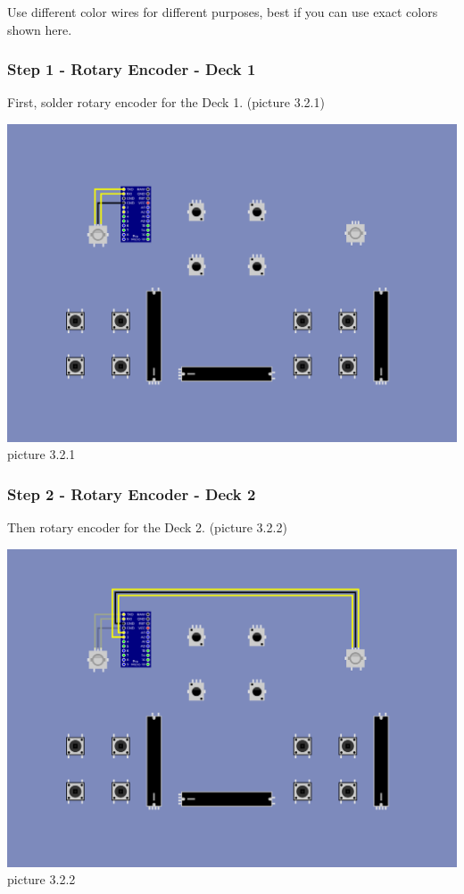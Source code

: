 \documentclass[12pt, a4paper]{article}
\begin{document}
			\noindent Use different color wires for different purposes, best if you can use exact colors shown here. \\
			
			\newpage
			
			
			\subsubsection{Step 1 - Rotary Encoder - Deck 1}
			
				\noindent First, solder rotary encoder for the Deck 1. (picture 3.2.1)
				
				\begin{center}
					\includegraphics[width=1\linewidth]{assets/illustrated_schematic_step1.png}
					picture 3.2.1
				\end{center} 
				
				\newpage
				
			\subsubsection{Step 2 - Rotary Encoder - Deck 2}
						
				\noindent Then rotary encoder for the Deck 2. (picture 3.2.2)
				
				\begin{center}
					\includegraphics[width=1\linewidth]{assets/illustrated_schematic_step2.png}
					picture 3.2.2
				\end{center} 
				
\end{document}
